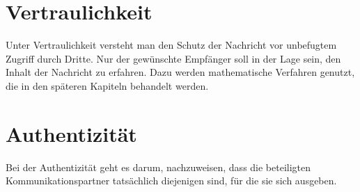 \section{Vertraulichkeit}

Unter Vertraulichkeit versteht man den Schutz der Nachricht vor unbefugtem Zugriff durch Dritte. Nur der gewünschte Empfänger soll in der Lage sein, den Inhalt der Nachricht zu erfahren. Dazu werden mathematische Verfahren genutzt, die in den späteren Kapiteln behandelt werden.

\section{Authentizität}

Bei der Authentizität geht es darum, nachzuweisen, dass die beteiligten Kommunikationspartner tatsächlich diejenigen sind, für die sie sich ausgeben.